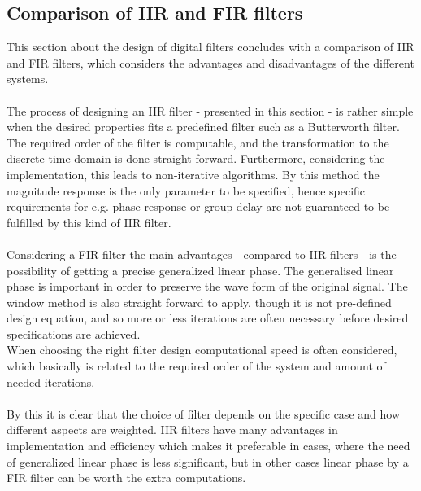 \subsection{Comparison of IIR and FIR filters}
This section about the design of digital filters concludes with a comparison of IIR and FIR filters, which considers the advantages and disadvantages of the different systems. \\ 
\\
The process of designing an IIR filter - presented in this section - is rather simple when the desired properties fits a predefined filter such as a Butterworth filter. The required order of the filter is computable, and the transformation to the discrete-time domain is done straight forward. Furthermore, considering the implementation, this leads to non-iterative algorithms. By this method the magnitude response is the only parameter to be specified, hence specific requirements for e.g. phase response or group delay are not guaranteed to be fulfilled by this kind of IIR filter. \\ \\
Considering a FIR filter the main advantages - compared to IIR filters - is the possibility of getting a precise generalized linear phase. The generalised linear phase is important in order to preserve the wave form of the original signal.  
The window method is also straight forward to apply, though it is not pre-defined design equation, and so more or less iterations are often necessary before desired specifications are achieved. \\
When choosing the right filter design computational speed is often considered, which basically is related to the required order of the system and amount of needed iterations. \\
\\
By this it is clear that the choice of filter depends on the specific case and how different aspects are weighted. IIR filters have many advantages in implementation and efficiency which makes it preferable in cases, where the need of generalized linear phase is less significant, but in other cases linear phase by a FIR filter can be worth the extra computations.